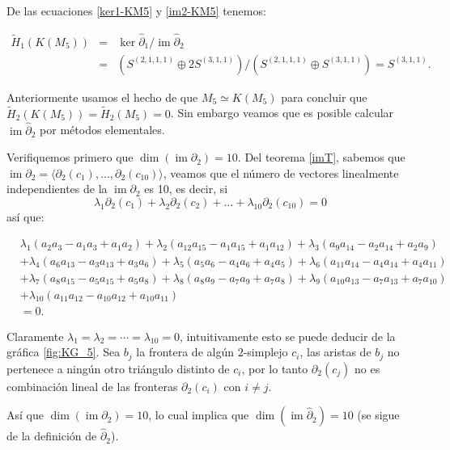 \documentclass[12pt]{book}
\theoremstyle{definition}
\DeclareMathOperator{\im}{im}
\newcounter{in}
\newcounter{ini}
\begin{document}
De las ecuaciones \ref{ker1-KM5} y \ref{im2-KM5} tenemos:

\begin{eqnarray*}
  \widetilde H_{1}(K(M_{5}))&=&\ker \widehat\partial_{1}/\im
  \widehat\partial_{2}\\
  &=&(S^{(2,1,1,1)}\oplus 2S^{(3,1,1)})/(S^{(2,1,1,1)}\oplus S^{(3,1,1)})=S^{(3,1,1)}.
\end{eqnarray*}

Anteriormente usamos el hecho de que $M_{5}\simeq K(M_{5})$  para
concluir que $\widetilde H_{2}(K(M_{5}))=\widetilde
H_{2}(M_{5})=0$. Sin embargo veamos que 
es posible calcular $\im \widehat\partial_{2}$ por métodos elementales.

Verifiquemos primero que $\dim(\im \partial_{2})=10$. Del teorema
\ref{imT}, sabemos que
$\im \partial_{2}=\langle\partial_{2}(c_{1}),\ldots,\partial_{2}(c_{10})\rangle$,
veamos que el número de vectores linealmente independientes de la
$\im \partial_{2}$ es 10, es
decir, si
$$\lambda_{1}\partial_{2}(c_{1})+\lambda_{2}\partial_{2}(c_{2})+\ldots+\lambda_{10}\partial_{2}(c_{10})=0$$
así que:

\begin{footnotesize}
  \begin{align*}
    &\lambda_{1}(a_{2}a_{3}-a_{1}a_{3}+a_{1}a_{2})+\lambda_{2}(a_{12}a_{15}-a_{1}a_{15}+a_{1}a_{12})+\lambda_{3}(a_{9}a_{14}-a_{2}a_{14}+a_{2}a_{9})\\
    &+\lambda_{4}(a_{6}a_{13}-a_{3}a_{13}+a_{3}a_{6})+\lambda_{5}(a_{5}a_{6}-a_{4}a_{6}+a_{4}a_{5})+\lambda_{6}(a_{11}a_{14}-a_{4}a_{14}+a_{4}a_{11})\\
    &+\lambda_{7}(a_{8}a_{15}-a_{5}a_{15}+a_{5}a_{8})+\lambda_{8}(a_{8}a_{9}-a_{7}a_{9}+a_{7}a_{8})+\lambda_{9}(a_{10}a_{13}-a_{7}a_{13}+a_{7}a_{10})\\
    &+\lambda_{10}(a_{11}a_{12}-a_{10}a_{12}+a_{10}a_{11})\\
    &=0.
  \end{align*}
\end{footnotesize}
Claramente $\lambda_{1}=\lambda_{2}=\cdots=\lambda_{10}=0$,
intuitivamente esto se puede deducir de la gráfica \ref{fig:KG_5}.
Sea $b_{j}$ la frontera de algún $2$-simplejo $c_{i}$, las aristas
de $b_{j}$ no pertenece a ningún otro triángulo distinto de $c_{i}$, por
lo tanto $\partial_{2}(c_{j})$ no es combinación lineal de las fronteras
$\partial_{2}(c_{i})$ con $i\neq j$.

Así que $\dim(\im\partial_{2})=10$, lo cual implica que
$\dim(\im\widehat\partial_{2})=10$ (se sigue de la definición de
$\widehat\partial_{2}$).
\end{document}
